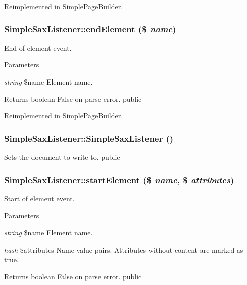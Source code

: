 Reimplemented in \hyperlink{class_simple_page_builder_a324ad1e5d69787482a64319a095e09c7}{SimplePageBuilder}.\hypertarget{class_simple_sax_listener_abfa321e2d3edcf3f00b585c8b26e46cb}{
\subsubsection[{endElement}]{\setlength{\rightskip}{0pt plus 5cm}SimpleSaxListener::endElement (\$ {\em name})}}
\label{class_simple_sax_listener_abfa321e2d3edcf3f00b585c8b26e46cb}
End of element event. 
\begin{DoxyParams}{Parameters}
\item[{\em string}]\$name Element name. \end{DoxyParams}
\begin{DoxyReturn}{Returns}
boolean False on parse error.  public 
\end{DoxyReturn}


Reimplemented in \hyperlink{class_simple_page_builder_a9c074127728a8588dac8dbf5c0f05439}{SimplePageBuilder}.\hypertarget{class_simple_sax_listener_ae114be1674844632a1f2f8362bf93018}{
\subsubsection[{SimpleSaxListener}]{\setlength{\rightskip}{0pt plus 5cm}SimpleSaxListener::SimpleSaxListener ()}}
\label{class_simple_sax_listener_ae114be1674844632a1f2f8362bf93018}
Sets the document to write to.  public \hypertarget{class_simple_sax_listener_a9094543df0d68dfa168c08087f8c868f}{
\subsubsection[{startElement}]{\setlength{\rightskip}{0pt plus 5cm}SimpleSaxListener::startElement (\$ {\em name}, \/  \$ {\em attributes})}}
\label{class_simple_sax_listener_a9094543df0d68dfa168c08087f8c868f}
Start of element event. 
\begin{DoxyParams}{Parameters}
\item[{\em string}]\$name Element name. \item[{\em hash}]\$attributes Name value pairs. Attributes without content are marked as true. \end{DoxyParams}
\begin{DoxyReturn}{Returns}
boolean False on parse error.  public 
\end{DoxyReturn}


